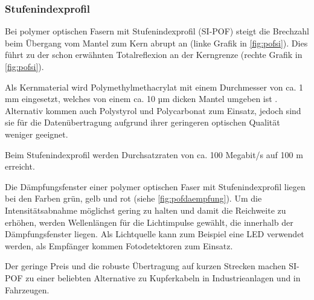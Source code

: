 \subsubsection{Stufenindexprofil}

Bei polymer optischen Fasern mit Stufenindexprofil (SI-POF) steigt die Brechzahl
beim Übergang vom Mantel zum Kern abrupt an (linke Grafik in
\autoref{fig:pofsi}). Dies führt zu der schon erwähnten Totalreflexion an der
Kerngrenze (rechte Grafik in \autoref{fig:pofsi}).

Als Kernmaterial wird Polymethylmethacrylat mit einem Durchmesser von ca. 1 mm
eingesetzt, welches von einem ca. 10 µm dicken Mantel umgeben ist
\cite{pofacsi}. Alternativ kommen auch Polystyrol und Polycarbonat zum Einsatz,
jedoch sind sie für die Datenübertragung aufgrund ihrer geringeren optischen
Qualität weniger geeignet.

Beim Stufenindexprofil werden Durchsatzraten von ca. 100 Megabit/s auf 100 m
erreicht.

Die Dämpfungsfenster einer polymer optischen Faser mit Stufenindexprofil liegen
bei den Farben grün, gelb und rot (siehe \autoref{fig:pofdaempfung}). Um die
Intensitätsabnahme möglichst gering zu halten und damit die Reichweite zu
erhöhen, werden Wellenlängen für die Lichtimpulse gewählt, die innerhalb der
Dämpfungsfenster liegen. Als Lichtquelle kann zum Beispiel eine LED verwendet
werden, als Empfänger kommen Fotodetektoren zum Einsatz.

Der geringe Preis und die robuste Übertragung auf kurzen Strecken machen SI-POF
zu einer beliebten Alternative zu Kupferkabeln in Industrieanlagen und in
Fahrzeugen. \cite{poflee}

